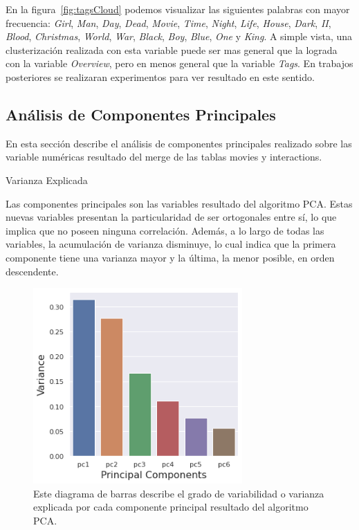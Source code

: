 \documentclass[11pt,a4paper,twoside]{thesis}
\begin{document}
En la figura~\ref{fig:tagsCloud} podemos visualizar las siguientes palabras con
mayor frecuencia: \textit{Girl}, \textit{Man}, \textit{Day}, \textit{Dead},
\textit{Movie}, \textit{Time}, \textit{Night}, \textit{Life}, \textit{House},
\textit{Dark}, \textit{II}, \textit{Blood}, \textit{Christmas}, \textit{World},
\textit{War}, \textit{Black}, \textit{Boy}, \textit{Blue}, \textit{One} y
\textit{King}. A simple vista, una clusterización realizada con esta variable
puede ser mas general que la lograda con la variable \textit{Overview}, pero en
menos general que la variable \textit{Tags}. En trabajos posteriores se
realizaran experimentos para ver resultado en este sentido.

\clearpage

\subsection{Análisis de Componentes Principales}

En esta sección describe el análisis de componentes principales realizado sobre
las variable numéricas resultado del merge de las tablas movies y interactions.

\begin{description}
	\item[Varianza Explicada]
\end{description}

Las componentes principales son las variables resultado del algoritmo PCA.
Estas nuevas variables presentan la particularidad de ser ortogonales entre sí,
lo que implica que no poseen ninguna correlación. Además, a lo largo de todas
las variables, la acumulación de varianza disminuye, lo cual indica que la
primera componente tiene una varianza mayor y la última, la menor posible, en
orden descendente.

\begin{figure}[h!]
	\centering
	\includegraphics[width=8cm]{./images/PCA-Variance.png}
	\caption{Este diagrama de barras describe el grado de variabilidad o varianza explicada por cada componente principal resultado del algoritmo PCA.}
	\label{fig:explainedVariancePlot}
\end{figure}
\end{document}
